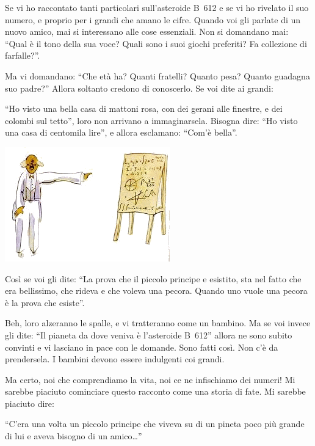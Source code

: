 \documentclass[11pt]{scrbook}
\begin{document}
Se vi ho raccontato tanti particolari sull'asteroide B~612 e se vi ho rivelato il suo numero, e proprio per i grandi che amano le cifre. Quando voi gli parlate di un nuovo amico, mai si interessano alle cose essenziali. Non si domandano mai: ``Qual è il tono della sua voce? Quali sono i suoi giochi preferiti? Fa collezione di farfalle?''.

Ma vi domandano: ``Che età ha? Quanti fratelli? Quanto pesa? Quanto guadagna suo padre?'' Allora soltanto credono di conoscerlo. Se voi dite ai grandi:

``Ho visto una bella casa di mattoni rosa, con dei gerani alle finestre, e dei colombi sul tetto'', loro non arrivano a immaginarsela. Bisogna dire: ``Ho visto una casa di centomila lire'', e allora esclamano: ``Com'è bella''.

\begin{center}
\includegraphics{img/4d}
\end{center}

Così se voi gli dite: ``La prova che il piccolo principe e esistito, sta nel fatto che era bellissimo, che rideva e che voleva una pecora. Quando uno vuole una pecora è la prova che esiste''.

Beh, loro alzeranno le spalle, e vi tratteranno come un bambino. Ma se voi invece gli dite: ``Il pianeta da dove veniva è l'asteroide B~612'' allora ne sono subito convinti e vi lasciano in pace con le domande. Sono fatti così. Non c'è da prendersela. I bambini devono essere indulgenti coi grandi.

Ma certo, noi che comprendiamo la vita, noi ce ne infischiamo dei numeri! Mi sarebbe piaciuto cominciare questo racconto come una storia di fate. Mi sarebbe piaciuto dire:

``C'era una volta un piccolo principe che viveva su di un pineta poco più grande di lui e aveva bisogno di un amico\ldots{}''
\end{document}
